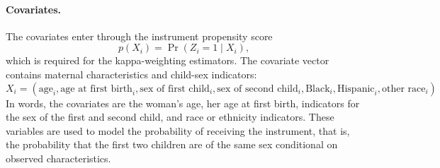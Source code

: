 \documentclass[12pt,a4paper]{article}
\begin{document}
\paragraph{Covariates.}
The covariates enter through the instrument propensity score
\begin{equation}
    p(X_i) = \Pr(Z_i = 1 \mid X_i),
\end{equation}
which is required for the kappa-weighting estimators. The covariate vector contains maternal characteristics and child-sex indicators:
\begin{equation}
    X_i =
    \left(
    \text{age}_i,
    \text{age at first birth}_i,
    \text{sex of first child}_i,
    \text{sex of second child}_i,
    \text{Black}_i,
    \text{Hispanic}_i,
    \text{other race}_i
    \right).
\end{equation}
In words, the covariates are the woman's age, her age at first birth, indicators for the sex of the first and second child, and race or ethnicity indicators. These variables are used to model the probability of receiving the instrument, that is, the probability that the first two children are of the same sex conditional on observed characteristics.





\end{document}
